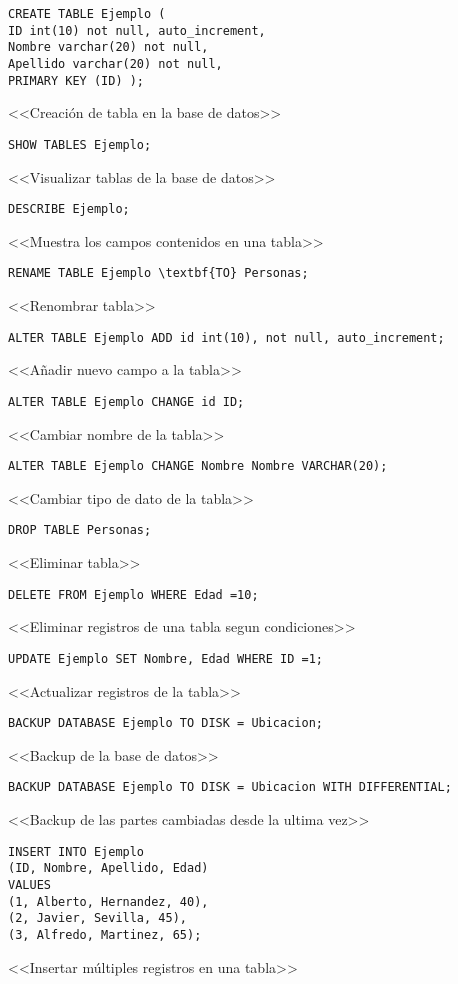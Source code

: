 \documentclass[a4paper, 11pt, titlepage]{article}
\begin{document}
\begin{verbatim}
CREATE TABLE Ejemplo ( 
ID int(10) not null, auto_increment,
Nombre varchar(20) not null,
Apellido varchar(20) not null,
PRIMARY KEY (ID) );
\end{verbatim}
<<Creación de tabla en la base de datos>> 
\begin{verbatim}
SHOW TABLES Ejemplo; 
\end{verbatim}
<<Visualizar tablas de la base de datos>> 
\begin{verbatim}
DESCRIBE Ejemplo;
\end{verbatim}
<<Muestra los campos contenidos en una tabla>> 
\begin{verbatim}
RENAME TABLE Ejemplo \textbf{TO} Personas;
\end{verbatim}
<<Renombrar tabla>>
\begin{verbatim}
ALTER TABLE Ejemplo ADD id int(10), not null, auto_increment;
\end{verbatim}
<<Añadir nuevo campo a la tabla>> 
\begin{verbatim}
ALTER TABLE Ejemplo CHANGE id ID;
\end{verbatim}
<<Cambiar nombre de la tabla>> \\
\begin{verbatim}
ALTER TABLE Ejemplo CHANGE Nombre Nombre VARCHAR(20);
\end{verbatim}
<<Cambiar tipo de dato de la tabla>> 
\begin{verbatim}
DROP TABLE Personas;
\end{verbatim}
<<Eliminar tabla>> 
\begin{verbatim}
DELETE FROM Ejemplo WHERE Edad =10;
\end{verbatim}
<<Eliminar registros de una tabla segun condiciones>> 
\begin{verbatim}
UPDATE Ejemplo SET Nombre, Edad WHERE ID =1;
\end{verbatim}
<<Actualizar registros de la tabla>> 
\begin{verbatim}
BACKUP DATABASE Ejemplo TO DISK = Ubicacion;
\end{verbatim}
<<Backup de la base de datos>> 
\begin{verbatim}
BACKUP DATABASE Ejemplo TO DISK = Ubicacion WITH DIFFERENTIAL;
\end{verbatim}
<<Backup de las partes cambiadas desde la ultima vez>> 
\begin{verbatim}
INSERT INTO Ejemplo
(ID, Nombre, Apellido, Edad)
VALUES
(1, Alberto, Hernandez, 40),
(2, Javier, Sevilla, 45),
(3, Alfredo, Martinez, 65);
\end{verbatim}
<<Insertar múltiples registros en una tabla>>
\end{document}
